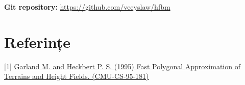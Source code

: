 \documentclass[12pt]{article}
\begin{document}

\medskip

\textbf{Git repository:} \url{https://github.com/veeyslaw/hfbm}

\section*{Referințe}

\medskip

[1] \href{http://reports-archive.adm.cs.cmu.edu/anon/anon/home/ftp/1995/CMU-CS-95-181.pdf} {Garland M. and Heckbert P. S. (1995) Fast Polygonal Approximation of Terrains and Height Fields. (CMU-CS-95-181)}
\end{document}
